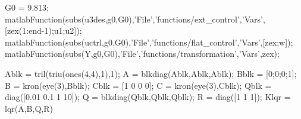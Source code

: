 \begin{MATLAB}
G0 = 9.813; %
matlabFunction(subs(u3des,g0,G0),'File','functions/ext_control','Vars',[zex(1:end-1);u1;u2]);
matlabFunction(subs(uctrl,g0,G0),'File','functions/flat_control','Vars',[zex;w]);
matlabFunction(subs(Y,g0,G0),'File','functions/transformation','Vars',zex);
% 

Ablk = tril(triu(ones(4,4),1),1); %
A = blkdiag(Ablk,Ablk,Ablk);
Bblk = [0;0;0;1];
B = kron(eye(3),Bblk);
Cblk = [1 0 0 0];
C = kron(eye(3),Cblk);
Qblk = diag([0.01 0.1 1 10]);
Q = blkdiag(Qblk,Qblk,Qblk);
R = diag([1 1 1]);
Klqr = lqr(A,B,Q,R)
% 
% 
% 
% 
% 
% 
% 


\end{MATLAB}
